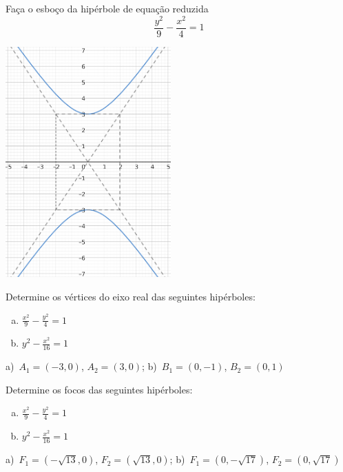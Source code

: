 \begin{exer}
  Faça o esboço da hipérbole de equação reduzida
  \begin{equation}
    \frac{y^2}{9} - \frac{x^2}{4} = 1
  \end{equation}
\end{exer}
\begin{resp}

  \includegraphics[width=2.5in]{cap_conicas/dados/fig_hiperbole_exer_oy/fig.png}
\end{resp}

\begin{exer}
  Determine os vértices do eixo real das seguintes hipérboles:
  \begin{enumerate}[a)]
  \item $\displaystyle \frac{x^2}{9} - \frac{y^2}{4} = 1$
  \item $\displaystyle y^2 - \frac{x^2}{16} = 1$
  \end{enumerate}
\end{exer}
\begin{resp}
  a)~$A_1=(-3,0)$, $A_2=(3,0)$; b)~$B_1=(0, -1)$, $B_2=(0, 1)$
\end{resp}

\begin{exer}
  Determine os focos das seguintes hipérboles:
  \begin{enumerate}[a)]
  \item $\displaystyle \frac{x^2}{9} - \frac{y^2}{4} = 1$
  \item $\displaystyle y^2 - \frac{x^2}{16} = 1$
  \end{enumerate}
\end{exer}
\begin{resp}
  a)~$F_1=(-\sqrt{13}, 0)$, $F_2=(\sqrt{13}, 0)$; b)~$F_1=(0, -\sqrt{17})$, $F_2=(0, \sqrt{17})$
\end{resp}

